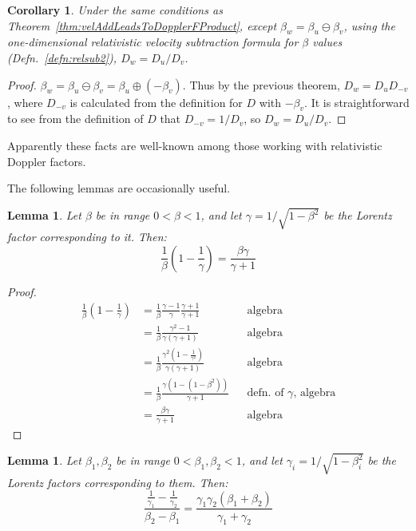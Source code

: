 \documentclass[a4paper]{article}
\theoremstyle{plain}
\newtheorem{corollary}[theorem]{Corollary}
\newtheorem{lemma}[theorem]{Lemma}
\theoremstyle{definition}
\begin{document}
\begin{corollary}
\label{thm:velSubLeadsToDopplerFQuotient}
Under the same conditions as Theorem~\ref{thm:velAddLeadsToDopplerFProduct},
except $\beta_w = \beta_u \ominus \beta_v$, using the one-dimensional
relativistic velocity subtraction formula for $\beta$ values
(Defn.~\eqref{defn:relsub2}),
$D_w = D_u / D_v$.
\end{corollary}

\begin{proof}
$\beta_w = \beta_u \ominus \beta_v = \beta_u \oplus (-\beta_v)$.
Thus by the previous theorem, $D_w = D_u D_{-v}$,
where $D_{-v}$ is calculated from the definition for $D$ with $-\beta_v$.
It is straightforward to see from the definition of $D$ that
$D_{-v} = 1/D_v$, so $D_w = D_u / D_v$.
\end{proof}

Apparently these facts are well-known among those working with
relativistic Doppler factors.

The following lemmas are occasionally useful.
\begin{lemma}
\label{lem:betaGammaIdentity1}
Let $\beta$ be in range $0 < \beta < 1$,
and let $\gamma = 1/\sqrt{1-\beta^2}$ be the Lorentz factor
corresponding to it.
Then:
\begin{equation}
\frac{1}{\beta} (1-\frac{1}{\gamma}) = \frac{\beta\gamma}{\gamma+1}
\end{equation}
\end{lemma}

\begin{proof}
\begin{align*}
\frac{1}{\beta} (1-\frac{1}{\gamma})
  & = \frac{1}{\beta} \frac{\gamma-1}{\gamma} \frac{\gamma+1}{\gamma+1} & & \text{algebra} \\
  & = \frac{1}{\beta} \frac{\gamma^2-1}{\gamma(\gamma+1)} & & \text{algebra} \\
  & = \frac{1}{\beta} \frac{\gamma^2(1-\frac{1}{\gamma^2})}{\gamma(\gamma+1)} & & \text{algebra} \\
  & = \frac{1}{\beta} \frac{\gamma(1-(1-\beta^2))}{\gamma+1} & & \text{defn. of $\gamma$, algebra} \\
  & = \frac{\beta\gamma}{\gamma+1} & & \text{algebra}
\end{align*}
\end{proof}

\begin{lemma}
\label{lem:betaGammaIdentity2}
Let $\beta_1, \beta_2$ be in range $0 < \beta_1, \beta_2 < 1$,
and let $\gamma_i = 1/\sqrt{1-\beta_i^2}$ be the Lorentz factors
corresponding to them.
Then:
\begin{equation}
\frac{\frac{1}{\gamma_1}-\frac{1}{\gamma_2}}{\beta_2-\beta_1}
  = \frac{\gamma_1\gamma_2(\beta_1+\beta_2)}{\gamma_1+\gamma_2}
\end{equation}
\end{lemma}
\end{document}
